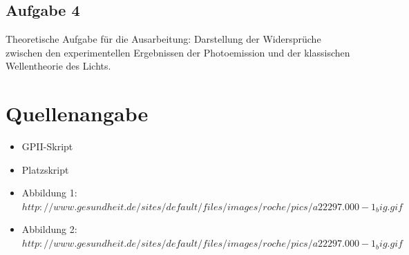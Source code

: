 \documentclass{article}
\begin{document}
\subsection{Aufgabe 4}
Theoretische Aufgabe für die Ausarbeitung: Darstellung der Widersprüche zwischen den experimentellen Ergebnissen der Photoemission und der klassischen Wellentheorie des Lichts.

\newpage
\section{Quellenangabe}
\begin{itemize}
\item GPII-Skript
\item Platzskript
\item Abbildung 1: \(http://www.gesundheit.de/sites/default/files/images/roche/pics/a22297.000-1_big.gif\)
\item Abbildung 2:  \(http://www.gesundheit.de/sites/default/files/images/roche/pics/a22297.000-1_big.gif\)
\end{itemize}

\newpage
\end{document}

